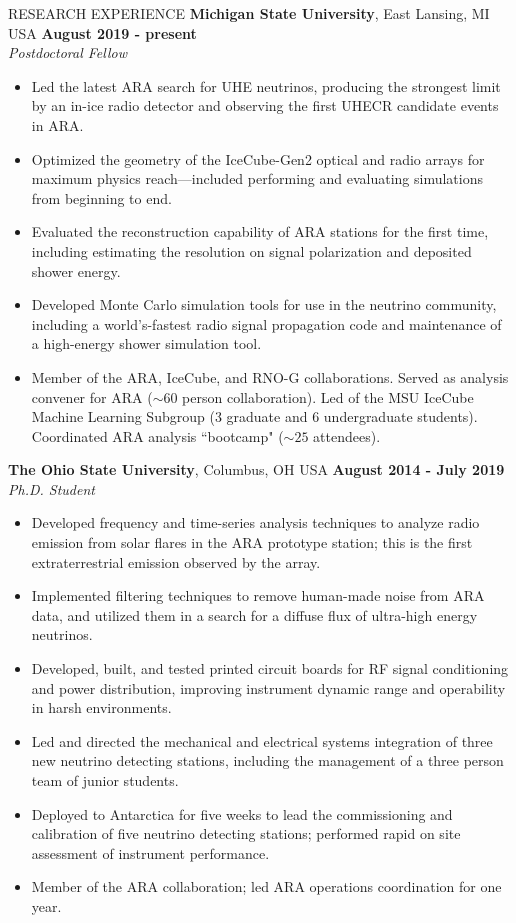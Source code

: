 \documentclass{resume} %
\begin{document}
\begin{rSection}{RESEARCH EXPERIENCE}
{\bf Michigan State University}, East Lansing, MI USA \hfill {\bf August 2019 - present} \\
{\em Postdoctoral Fellow}%
\begin{itemize}
\vspace*{-.05in}
\item Led the latest ARA search for UHE neutrinos, producing the strongest limit by an in-ice radio detector and observing the first UHECR candidate events in ARA.
\item Optimized the geometry of the IceCube-Gen2 optical and radio arrays for maximum physics reach---included performing and evaluating simulations from beginning to end.
\item Evaluated the reconstruction capability of ARA stations for the first time, including estimating the resolution on signal polarization and deposited shower energy.
\item Developed Monte Carlo simulation tools for use in the neutrino community, including a world's-fastest radio signal propagation code and maintenance of a high-energy shower simulation tool.
\item Member of the ARA, IceCube, and RNO-G collaborations.  Served as analysis convener for ARA ($\sim60$ person collaboration). Led of the MSU IceCube Machine Learning Subgroup (3 graduate and 6 undergraduate students). Coordinated ARA analysis ``bootcamp" ($\sim25$ attendees).
\end{itemize}

{\bf The Ohio State University}, Columbus, OH USA \hfill {\bf August 2014 - July 2019} \\
{\em Ph.D. Student}%
\begin{itemize}
\vspace*{-.05in}
\item Developed frequency and time-series analysis techniques to analyze radio emission from solar flares in the ARA prototype station; this is the first extraterrestrial emission observed by the array.
\item Implemented filtering techniques to remove human-made noise from ARA data, and utilized them in a search for a diffuse flux of ultra-high energy neutrinos.
\item Developed, built, and tested printed circuit boards for RF signal conditioning and power distribution, improving instrument dynamic range and operability in harsh environments.
\item Led and directed the mechanical and electrical systems integration of three new neutrino detecting stations, including the management of a three person team of junior students.
\item Deployed to Antarctica for five weeks to lead the commissioning and calibration of five neutrino detecting stations; performed rapid on site assessment of instrument performance.
\item Member of the ARA collaboration; led ARA operations coordination for one year.
\end{itemize}


\end{rSection}
\end{document}

